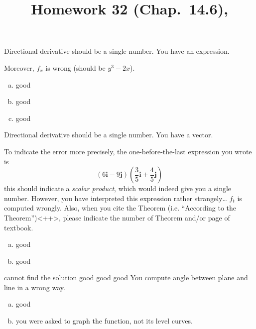 \documentclass[pstricks,10pt,dvipsnames]{article} %
\title{Homework 32 (Chap.~14.6),
}
\begin{document}
\maketitle
{}
Directional derivative should be a single number. You have an expression.

Moreover, $f_x$ is wrong (should be $y^3-2x$).
\begin{enumerate}[(a)]
	\item good
	\item good
	\item good
\end{enumerate}
Directional derivative should be a single number. You have a vector.

To indicate the error more precisely, the one-before-the-last expression you wrote is
\begin{equation*}
	\left( 6\mathbf{i} -9\mathbf{j}\right)
	\left( \frac{3}{5}\mathbf{i}+\frac{4}{5}\mathbf{j} \right)
\end{equation*}
this should indicate a \textit{scalar product}, which would indeed give you a single number. However, you
have interpreted this expression rather strangely\dots
{}
$f_t$ is computed wrongly. Also, when you cite the Theorem (i.e. ``According to the Theorem'')<++>, please indicate the
number of Theorem and/or page of textbook.
\begin{enumerate}[(a)]
	\item good
	\item good
\end{enumerate}
cannot find the solution
good
good
good
You compute angle between plane and line in a wrong way.
\begin{enumerate}[(a)]
	\item good
	\item you were asked to graph the function, not its level curves.
\end{enumerate}
\end{document}

